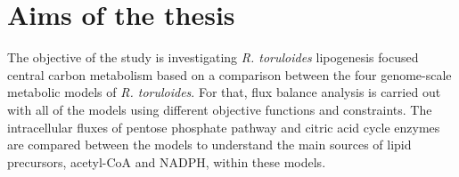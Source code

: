 \chapter{Aims of the thesis}

The objective of the study is investigating \textit{R. toruloides} lipogenesis
focused central carbon metabolism based on a comparison between the four genome-scale metabolic models of \textit{R. toruloides}.
For that, flux balance analysis is carried out with all of the models using different objective functions and constraints. 
The intracellular fluxes of pentose phosphate pathway and citric acid cycle enzymes are compared between the models to understand the main sources of lipid precursors, acetyl-CoA and NADPH, within these models. 

